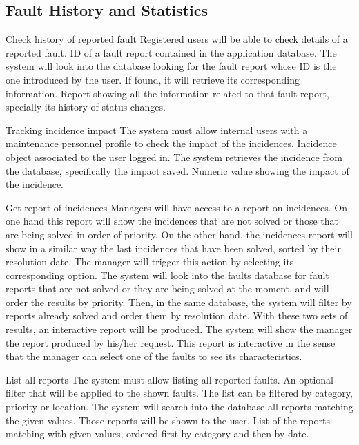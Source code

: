 \subsection{Fault History and Statistics}

\begin{requirement}{Check history of reported fault}
\reqdesc Registered users will be able to check details of a reported fault.
\reqin ID of a fault report contained in the application database.
\reqsteps The system will look into the database looking for the fault report whose ID is the one introduced by the user. If found, it will retrieve its corresponding information.
\reqout Report showing all the information related to that fault report, specially its history of status changes.
\end{requirement}

\begin{requirement}{Tracking incidence impact}
\reqdesc The system must allow internal users with a maintenance personnel profile to check the impact of the incidences.
\reqin Incidence object associated to the user logged in.
\reqsteps The system retrieves the incidence from the database, specifically the impact saved.
\reqout Numeric value showing the impact of the incidence.
\end{requirement}

\begin{requirement}{Get report of incidences}
\reqdesc Managers will have access to a report on incidences. On one hand this report will show the incidences that are not solved or those that are being solved in order of priority. On the other hand, the incidences report will show in a similar way the last incidences that have been solved, sorted by
their resolution date.
\reqin The manager will trigger this action by selecting its corresponding option.
\reqsteps The system will look into the faults database for fault reports that are not solved or they are being solved at the moment, and will order the results by priority. Then, in the same database, the system will filter by reports already solved and order them by resolution date. With these two sets of results, an interactive report will be produced.
\reqout The system will show the manager the report produced by his/her request. This report is interactive in the sense that the manager can select one of the faults to see its characteristics.
\end{requirement}

\begin{requirement}{List all reports}\label{A4-ListAllReports}
\reqdesc The system must allow listing all reported faults.
\reqin An optional filter that will be applied to the shown faults. The list can be filtered by category, priority or location.
\reqsteps The system will search into the database all reports matching the given values. Those reports will be shown to the user.
\reqout List of the reports matching with given values, ordered first by category and then by date.
\end{requirement}

